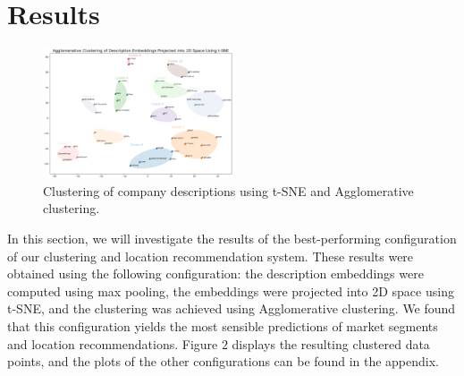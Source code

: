 \documentclass[conference]{IEEEtran}
\begin{document}
\section{Results}
\begin{figure}[H]
    \centering
    \includegraphics[width=0.5\textwidth]{figures/clustering_tsne.png}
    \caption{Clustering of company descriptions using t-SNE and Agglomerative clustering.}
    \label{fig:t-sne-agglomerative}
\end{figure}

In this section, we will investigate the results of the best-performing configuration of our clustering and location recommendation system. These results were obtained using the following configuration: the description embeddings were computed using max pooling, the embeddings were projected into 2D space using t-SNE, and the clustering was achieved using Agglomerative clustering. We found that this configuration yields the most sensible predictions of market segments and location recommendations. Figure \hyperref[fig:t-sne-agglomerative]{$2$} displays the resulting clustered data points, and the plots of the other configurations can be found in the appendix.
\end{document}
